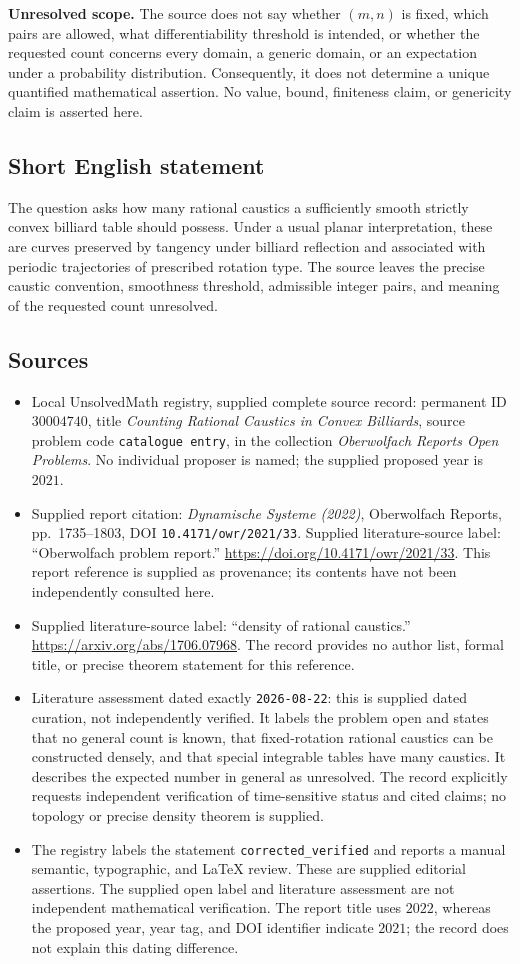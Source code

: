 \documentclass[11pt]{article}
\begin{document}
\textbf{Unresolved scope.} The source does not say whether \((m,n)\) is fixed, which pairs are allowed, what differentiability threshold is intended, or whether the requested count concerns every domain, a generic domain, or an expectation under a probability distribution. Consequently, it does not determine a unique quantified mathematical assertion. No value, bound, finiteness claim, or genericity claim is asserted here.
\subsection{Short English statement}
The question asks how many rational caustics a sufficiently smooth strictly convex billiard table should possess. Under a usual planar interpretation, these are curves preserved by tangency under billiard reflection and associated with periodic trajectories of prescribed rotation type. The source leaves the precise caustic convention, smoothness threshold, admissible integer pairs, and meaning of the requested count unresolved.
\subsection{Sources}
\begin{itemize}
\item Local UnsolvedMath registry, supplied complete source record: permanent ID \(30004740\), title \emph{Counting Rational Caustics in Convex Billiards}, source problem code \texttt{catalogue entry}, in the collection \emph{Oberwolfach Reports Open Problems}. No individual proposer is named; the supplied proposed year is \(2021\).
\item Supplied report citation: \emph{Dynamische Systeme (2022)}, Oberwolfach Reports, pp.~1735--1803, DOI \texttt{10.4171/owr/2021/33}. Supplied literature-source label: ``Oberwolfach problem report.'' \url{https://doi.org/10.4171/owr/2021/33}. This report reference is supplied as provenance; its contents have not been independently consulted here.
\item Supplied literature-source label: ``density of rational caustics.'' \url{https://arxiv.org/abs/1706.07968}. The record provides no author list, formal title, or precise theorem statement for this reference.
\item Literature assessment dated exactly \texttt{2026-08-22}: this is supplied dated curation, not independently verified. It labels the problem open and states that no general count is known, that fixed-rotation rational caustics can be constructed densely, and that special integrable tables have many caustics. It describes the expected number in general as unresolved. The record explicitly requests independent verification of time-sensitive status and cited claims; no topology or precise density theorem is supplied.
\item The registry labels the statement \texttt{corrected\_verified} and reports a manual semantic, typographic, and LaTeX review. These are supplied editorial assertions. The supplied open label and literature assessment are not independent mathematical verification. The report title uses \(2022\), whereas the proposed year, year tag, and DOI identifier indicate \(2021\); the record does not explain this dating difference.
\end{itemize}
\end{document}
